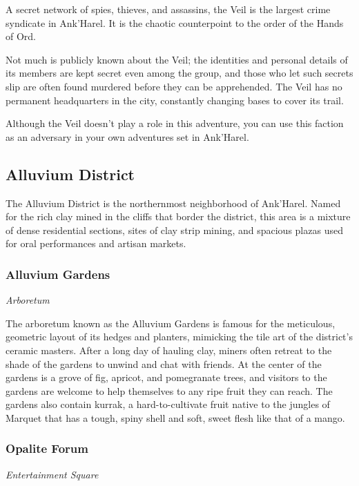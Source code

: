\documentclass[letterpaper, 11pt, bg=full, twocolumn]{dndbook}
\begin{document}
A secret network of spies, thieves, and assassins, the Veil is the largest crime syndicate in Ank'Harel. It is the chaotic counterpoint to the order of the Hands of Ord.

Not much is publicly known about the Veil; the identities and personal details of its members are kept secret even among the group, and those who let such secrets slip are often found murdered before they can be apprehended. The Veil has no permanent headquarters in the city, constantly changing bases to cover its trail.

Although the Veil doesn't play a role in this adventure, you can use this faction as an adversary in your own adventures set in Ank'Harel.

\subsection{Alluvium District}

The Alluvium District is the northernmost neighborhood of Ank'Harel. Named for the rich clay mined in the cliffs that border the district, this area is a mixture of dense residential sections, sites of clay strip mining, and spacious plazas used for oral performances and artisan markets.


\subsubsection{Alluvium Gardens}

\textit{Arboretum}

The arboretum known as the Alluvium Gardens is famous for the meticulous, geometric layout of its hedges and planters, mimicking the tile art of the district's ceramic masters. After a long day of hauling clay, miners often retreat to the shade of the gardens to unwind and chat with friends. At the center of the gardens is a grove of fig, apricot, and pomegranate trees, and visitors to the gardens are welcome to help themselves to any ripe fruit they can reach. The gardens also contain kurrak, a hard-to-cultivate fruit native to the jungles of Marquet that has a tough, spiny shell and soft, sweet flesh like that of a mango.

\subsubsection{Opalite Forum}

\textit{Entertainment Square}
\end{document}
